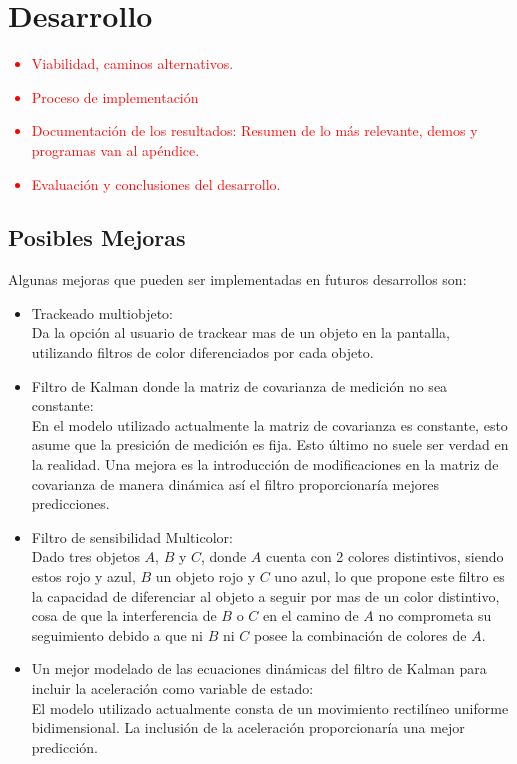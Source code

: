 \section{Desarrollo}

\textcolor{red}{
\begin{itemize}
	\item Viabilidad, caminos alternativos.
	\item Proceso de implementación
	\item Documentación de los resultados: Resumen de lo más relevante, demos y programas van al apéndice.
	\item Evaluación y conclusiones del desarrollo.
\end{itemize}
}
\subsection{Posibles Mejoras}
Algunas mejoras que pueden ser implementadas en futuros desarrollos son:
\begin{itemize}
\item Trackeado multiobjeto: \\
Da la opción al usuario de trackear mas de un objeto en la pantalla, utilizando filtros de color diferenciados por cada objeto.
\item Filtro de Kalman donde la matriz de covarianza de medición no sea constante: \\
En el modelo utilizado actualmente la matriz de covarianza es constante, esto asume que la presición de  medición es fija. Esto último no suele ser verdad en la realidad. Una mejora es la introducción de modificaciones en la matriz de covarianza de manera dinámica así el filtro proporcionaría mejores predicciones. 





\item Filtro de sensibilidad Multicolor: \\
Dado tres objetos $A$, $B$ y $C$, donde $A$ cuenta con 2 colores distintivos, siendo estos rojo y azul, $B$ un objeto rojo y $C$ uno azul, lo que propone este filtro es la capacidad de diferenciar al objeto a seguir por mas de un color distintivo, cosa de que la interferencia de $B$ o $C$ en el camino de $A$ no comprometa su seguimiento debido a que ni $B$ ni $C$ posee la combinación de colores de $A$.
\item Un mejor modelado de las ecuaciones dinámicas del filtro de Kalman para incluir la aceleración como variable de estado: \\
El modelo utilizado actualmente consta de un movimiento rectilíneo uniforme bidimensional. La inclusión de la aceleración proporcionaría una mejor predicción.
\end{itemize}




